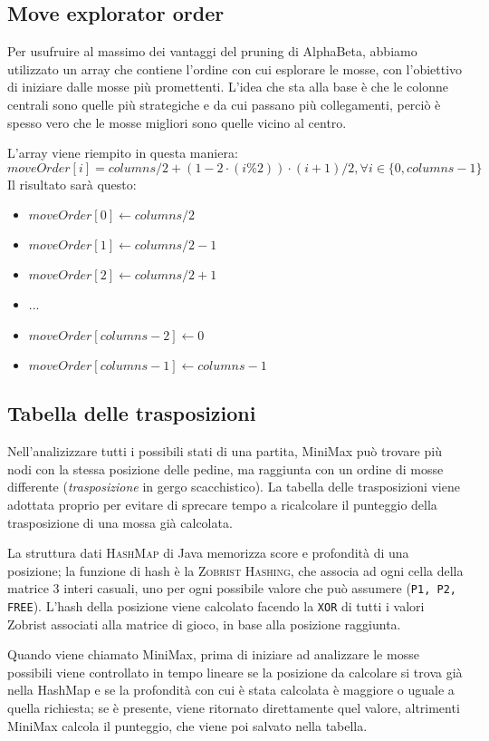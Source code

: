 \documentclass{article}
\begin{document}
\pagebreak


\subsection{Move explorator order}
Per usufruire al massimo dei vantaggi del pruning di AlphaBeta, abbiamo utilizzato un array che contiene
l'ordine con cui esplorare le mosse, con l'obiettivo di iniziare dalle mosse più promettenti.
L'idea che sta alla base è che le colonne centrali sono quelle più strategiche e da cui passano
più collegamenti, perciò è spesso vero che le mosse migliori sono quelle vicino al centro.

L'array viene riempito in questa maniera:
$$moveOrder[i] = columns / 2 + (1 - 2 \cdot (i \% 2)) \cdot (i + 1) / 2, \forall i \in \{0,columns-1\} $$
Il risultato sarà questo: 
\begin{itemize}
  \item $moveOrder[0] \gets columns/2$
  \item $moveOrder[1] \gets columns/2 -1$
  \item $moveOrder[2] \gets columns/2 +1$
  \item ...
  \item $moveOrder[columns-2] \gets 0$
  \item $moveOrder[columns-1] \gets columns-1$
\end{itemize}

\subsection{Tabella delle trasposizioni}

Nell'analizizzare tutti i possibili stati di una partita, MiniMax può trovare più nodi con la stessa
posizione delle pedine, ma raggiunta con un ordine di mosse differente (\emph{trasposizione} 
in gergo scacchistico). La tabella delle trasposizioni viene adottata proprio per evitare di sprecare 
tempo a ricalcolare il punteggio della trasposizione di una mossa già calcolata.

La struttura dati \textsc{HashMap} di Java memorizza score e profondità di una posizione; la funzione di 
hash è la \textsc{Zobrist Hashing}, che associa ad ogni cella della matrice 3 interi casuali, uno per 
ogni possibile valore che può assumere (\verb!P1, P2, FREE!). L'hash della posizione viene calcolato 
facendo la \verb!XOR! di tutti i valori Zobrist associati alla matrice di gioco, in base alla 
posizione raggiunta.

Quando viene chiamato MiniMax, prima di iniziare ad analizzare le mosse possibili viene controllato
in tempo lineare se la posizione da calcolare si trova già nella HashMap e se la profondità con cui è
stata calcolata è maggiore o uguale a quella richiesta; se è presente, viene ritornato direttamente
quel valore, altrimenti MiniMax calcola il punteggio, che viene poi salvato nella tabella.
\end{document}
